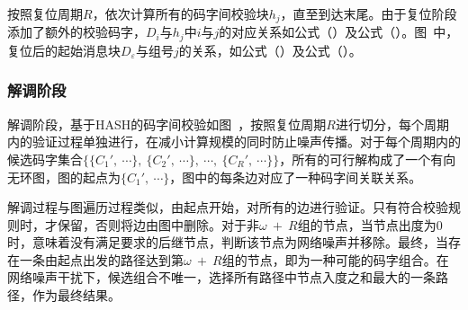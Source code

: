 按照复位周期$R$，依次计算所有的码字间校验块$h_{j}$，直至到达末尾。由于复位阶段添加了额外的校验码字，$D_{i}$与$h_{j}$中$i$与$j$的对应关系如公式（）及公式（）。图\ 中，复位后的起始消息块$D_{\varepsilon}$与组号$j$的关系，如公式（）及公式（）。

\subsubsection{解调阶段}
\label{chap:hash:robustness:hash:demodulation}


解调阶段，基于HASH的码字间校验如图\ ，按照复位周期$R$进行切分，每个周期内的验证过程单独进行，在减小计算规模的同时防止噪声传播。对于每个周期内的候选码字集合$\{\{C_{1}',\ \cdots\},\ \{C_{2}',\ \cdots \},\ \cdots ,\ \{C_{R}',\ \cdots\}\}$，所有的可行解构成了一个有向无环图，图的起点为$\{C_{1}',\ \cdots \}$，图中的每条边对应了一种码字间关联关系。

解调过程与图遍历过程类似，由起点开始，对所有的边进行验证。只有符合校验规则时，才保留，否则将边由图中删除。对于非$\omega\ +\ R$组的节点，当节点出度为0时，意味着没有满足要求的后继节点，判断该节点为网络噪声并移除。最终，当存在一条由起点出发的路径达到第$\omega\ +\ R$组的节点，即为一种可能的码字组合。在网络噪声干扰下，候选组合不唯一，选择所有路径中节点入度之和最大的一条路径，作为最终结果。

